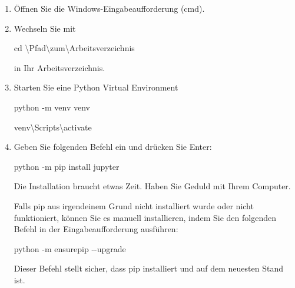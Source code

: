 \documentclass[
  nswissgerman,
  a4paper,
  DIV=11,
  numbers=noendperiod,
  ngerman]{scrreprt}
\newenvironment{Shaded}{\begin{snugshade}}{\end{snugshade}}
\newcommand{\AttributeTok}[1]{\textcolor[rgb]{0.40,0.45,0.13}{#1}}
\newcommand{\BuiltInTok}[1]{\textcolor[rgb]{0.00,0.23,0.31}{#1}}
\newcommand{\DataTypeTok}[1]{\textcolor[rgb]{0.68,0.00,0.00}{#1}}
\newcommand{\ExtensionTok}[1]{\textcolor[rgb]{0.00,0.23,0.31}{#1}}
\newcommand{\NormalTok}[1]{\textcolor[rgb]{0.00,0.23,0.31}{#1}}
\begin{document}
\begin{enumerate}
\def\labelenumi{\arabic{enumi}.}
\item
  Öffnen Sie die Windows-Eingabeaufforderung (cmd).
\item
  Wechseln Sie mit

\begin{Shaded}
\begin{Highlighting}[numbers=left,,]
\BuiltInTok{cd} \DataTypeTok{\textbackslash{}P}\NormalTok{fad}\DataTypeTok{\textbackslash{}z}\NormalTok{um}\DataTypeTok{\textbackslash{}A}\NormalTok{rbeitsverzeichnis}
\end{Highlighting}
\end{Shaded}

  in Ihr Arbeitsverzeichnis.
\item
  Starten Sie eine Python Virtual Environment

\begin{Shaded}
\begin{Highlighting}[numbers=left,,]
\ExtensionTok{python} \AttributeTok{{-}m}\NormalTok{ venv venv}

\ExtensionTok{venv\textbackslash{}Scripts\textbackslash{}activate}
\end{Highlighting}
\end{Shaded}
\item
  Geben Sie folgenden Befehl ein und drücken Sie Enter:

\begin{Shaded}
\begin{Highlighting}[numbers=left,,]
\ExtensionTok{python} \AttributeTok{{-}m}\NormalTok{ pip install jupyter}
\end{Highlighting}
\end{Shaded}

  Die Installation braucht etwas Zeit. Haben Sie Geduld mit Ihrem
  Computer.

  Falls pip aus irgendeinem Grund nicht installiert wurde oder nicht
  funktioniert, können Sie es manuell installieren, indem Sie den
  folgenden Befehl in der Eingabeaufforderung ausführen:

\begin{Shaded}
\begin{Highlighting}[numbers=left,,]
\ExtensionTok{python} \AttributeTok{{-}m}\NormalTok{ ensurepip }\AttributeTok{{-}{-}upgrade}
\end{Highlighting}
\end{Shaded}

  Dieser Befehl stellt sicher, dass pip installiert und auf dem neuesten
  Stand ist.
\end{enumerate}
\end{document}
